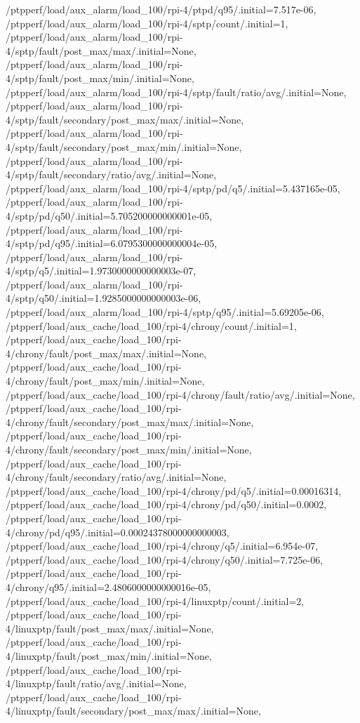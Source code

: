 {    /ptpperf/load/aux_alarm/load_100/rpi-4/ptpd/q95/.initial=7.517e-06,
    /ptpperf/load/aux_alarm/load_100/rpi-4/sptp/count/.initial=1,
    /ptpperf/load/aux_alarm/load_100/rpi-4/sptp/fault/post_max/max/.initial=None,
    /ptpperf/load/aux_alarm/load_100/rpi-4/sptp/fault/post_max/min/.initial=None,
    /ptpperf/load/aux_alarm/load_100/rpi-4/sptp/fault/ratio/avg/.initial=None,
    /ptpperf/load/aux_alarm/load_100/rpi-4/sptp/fault/secondary/post_max/max/.initial=None,
    /ptpperf/load/aux_alarm/load_100/rpi-4/sptp/fault/secondary/post_max/min/.initial=None,
    /ptpperf/load/aux_alarm/load_100/rpi-4/sptp/fault/secondary/ratio/avg/.initial=None,
    /ptpperf/load/aux_alarm/load_100/rpi-4/sptp/pd/q5/.initial=5.437165e-05,
    /ptpperf/load/aux_alarm/load_100/rpi-4/sptp/pd/q50/.initial=5.705200000000001e-05,
    /ptpperf/load/aux_alarm/load_100/rpi-4/sptp/pd/q95/.initial=6.0795300000000004e-05,
    /ptpperf/load/aux_alarm/load_100/rpi-4/sptp/q5/.initial=1.9730000000000003e-07,
    /ptpperf/load/aux_alarm/load_100/rpi-4/sptp/q50/.initial=1.9285000000000003e-06,
    /ptpperf/load/aux_alarm/load_100/rpi-4/sptp/q95/.initial=5.69205e-06,
    /ptpperf/load/aux_cache/load_100/rpi-4/chrony/count/.initial=1,
    /ptpperf/load/aux_cache/load_100/rpi-4/chrony/fault/post_max/max/.initial=None,
    /ptpperf/load/aux_cache/load_100/rpi-4/chrony/fault/post_max/min/.initial=None,
    /ptpperf/load/aux_cache/load_100/rpi-4/chrony/fault/ratio/avg/.initial=None,
    /ptpperf/load/aux_cache/load_100/rpi-4/chrony/fault/secondary/post_max/max/.initial=None,
    /ptpperf/load/aux_cache/load_100/rpi-4/chrony/fault/secondary/post_max/min/.initial=None,
    /ptpperf/load/aux_cache/load_100/rpi-4/chrony/fault/secondary/ratio/avg/.initial=None,
    /ptpperf/load/aux_cache/load_100/rpi-4/chrony/pd/q5/.initial=0.00016314,
    /ptpperf/load/aux_cache/load_100/rpi-4/chrony/pd/q50/.initial=0.0002,
    /ptpperf/load/aux_cache/load_100/rpi-4/chrony/pd/q95/.initial=0.00024378000000000003,
    /ptpperf/load/aux_cache/load_100/rpi-4/chrony/q5/.initial=6.954e-07,
    /ptpperf/load/aux_cache/load_100/rpi-4/chrony/q50/.initial=7.725e-06,
    /ptpperf/load/aux_cache/load_100/rpi-4/chrony/q95/.initial=2.4806000000000016e-05,
    /ptpperf/load/aux_cache/load_100/rpi-4/linuxptp/count/.initial=2,
    /ptpperf/load/aux_cache/load_100/rpi-4/linuxptp/fault/post_max/max/.initial=None,
    /ptpperf/load/aux_cache/load_100/rpi-4/linuxptp/fault/post_max/min/.initial=None,
    /ptpperf/load/aux_cache/load_100/rpi-4/linuxptp/fault/ratio/avg/.initial=None,
    /ptpperf/load/aux_cache/load_100/rpi-4/linuxptp/fault/secondary/post_max/max/.initial=None,
}
